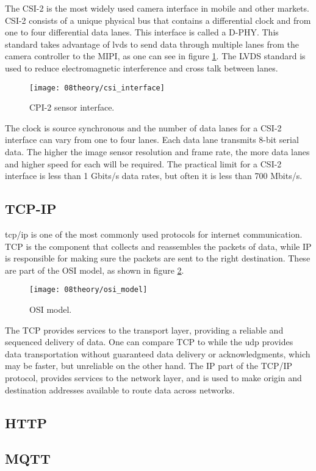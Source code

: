 The CSI-2 is the most widely used camera interface in mobile and other markets. CSI-2 consists of a unique physical bus that contains a differential clock and from one to four differential data lanes. This interface is called a D-PHY. This standard takes advantage of \ac{lvds} to send data through multiple lanes from the camera controller to the MIPI, as one can see in figure \ref{fig:csi_interface}. The LVDS standard is used to reduce electromagnetic interference and cross talk between lanes.

\begin{figure}[H]
	\centering
	\texttt{[image: 08theory/csi\_interface]}
	\caption{CPI-2 sensor interface.}
	\label{fig:csi_interface}
\end{figure}

The clock is source synchronous and the number of data lanes for a CSI-2 interface can vary from one to four lanes. Each data lane transmits 8-bit serial data. The higher the image sensor resolution and frame rate, the more data lanes and higher speed for each will be required. The practical limit for a CSI-2 interface is less than 1 Gbits/s data rates, but often it is less than 700 Mbits/s. \cite{csi_interface}

\clearpage
\subsection{TCP-IP}
\ac{tcp}/\ac{ip} is one of the most commonly used protocols for internet communication. TCP is the component that collects and reassembles the packets of data, while IP is responsible for making sure the packets are sent to the right destination. These are part of the OSI model, as shown in figure \ref{fig:osi_model}.

\begin{figure}[H]
	\centering
	\texttt{[image: 08theory/osi\_model]}
	\caption{OSI model.}
	\label{fig:osi_model}
\end{figure}

The TCP provides services to the transport layer, providing a reliable and sequenced delivery of data. One can compare TCP to while the \ac{udp} provides data transportation without guaranteed data delivery or acknowledgments, which may be faster, but unreliable on the other hand. The IP part of the TCP/IP protocol, provides services to the network layer, and is used to make origin and destination addresses available to route data across networks.

\subsection{HTTP}
\subsection{MQTT}